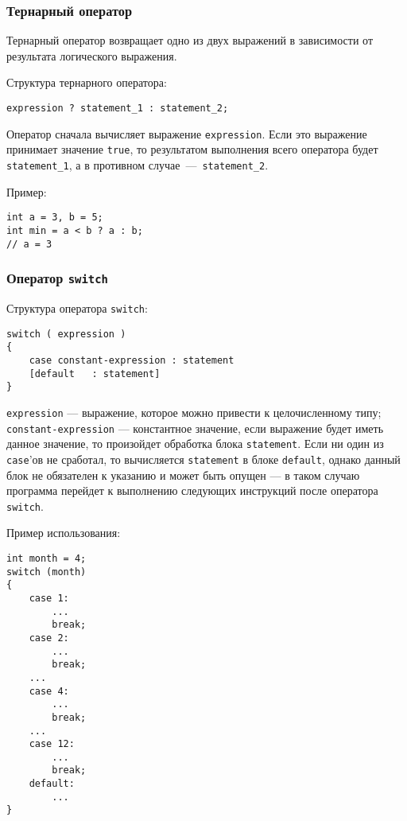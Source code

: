 \subsubsection{Тернарный оператор}
\label{subsubsec:ternaryOperator}
Тернарный оператор возвращает одно из двух выражений в зависимости от результата логического выражения.

Структура тернарного оператора:

\begin{lstlisting}
expression ? statement_1 : statement_2;
\end{lstlisting}

Оператор сначала вычисляет выражение \lstinline{expression}.
Если это выражение принимает значение \lstinline|true|,
то результатом выполнения всего оператора будет \lstinline|statement_1|,
а в противном случае~---~\lstinline|statement_2|.

Пример:
\begin{lstlisting}
int a = 3, b = 5;
int min = a < b ? a : b;
// a = 3
\end{lstlisting}

\subsubsection{Оператор \texttt{switch}}
Структура оператора \lstinline|switch|:
\begin{lstlisting}
switch ( expression )
{
    case constant-expression : statement
    [default   : statement]
}
\end{lstlisting}

\lstinline|expression| --- выражение, которое можно привести к целочисленному типу; \lstinline|constant-expression| --- константное значение, если выражение будет иметь данное значение, то произойдет обработка блока \lstinline|statement|. Если ни один из \lstinline|case|'ов не сработал, то вычисляется \lstinline|statement| в блоке \lstinline|default|, однако данный блок не обязателен к указанию и может быть опущен --- в таком случаю программа перейдет к выполнению следующих инструкций после оператора \lstinline|switch|.

Пример использования:
\begin{lstlisting}
int month = 4;
switch (month)
{
    case 1:
        ...
        break;
    case 2:
        ...
        break;
    ...
    case 4:
        ...
        break;
    ...
    case 12:
        ...
        break;
    default:
        ...
}
\end{lstlisting}

